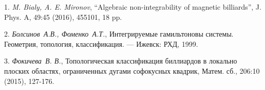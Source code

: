 \litlist

1. {\it M. Bialy, A. E. Mironov}, “Algebraic non-integrability of magnetic billiards”,
J. Phys. A, 49:45 (2016), 455101, 18 pp.

2. {\it Болсинов~А.В., Фоменко~А.Т.}, Интегрируемые гамильтоновы системы. Геометрия, топология, классификация.
--- Ижевск: РХД, 1999.

3. {\it Фокичева~В. В.}, Топологическая классификация биллиардов в локально плоских областях, ограниченных дугами софокусных квадрик, Матем. сб., 206:10 (2015), 127-176.

